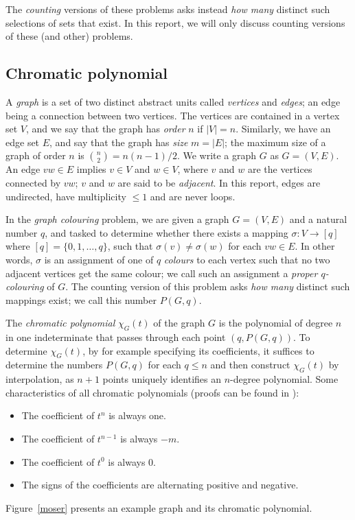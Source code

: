 \documentclass{cslthse-msc}
\begin{document}
The \emph{counting} versions of these problems asks instead \emph{how many} distinct such selections of sets that exist. In this report, we will only discuss counting versions of these (and other) problems.

\subsection{Chromatic polynomial}
A \emph{graph} is a set of two distinct abstract units called \emph{vertices} and \emph{edges}; an edge being a connection between two vertices. The vertices are contained in a vertex set $V$, and we say that the graph has \emph{order} $n$ if $|V| = n$. Similarly, we have an edge set $E$, and say that the graph has \emph{size} $m = |E|$; the maximum size of a graph of order $n$ is $\binom{n}{2} = n(n-1)/2$. We write a graph $G$ as $G = (V,E)$. An edge $vw \in E$ implies $v \in V$ and $w \in V$, where $v$ and $w$ are the vertices connected by $vw$; $v$ and $w$ are said to be \emph{adjacent}. In this report, edges are undirected, have multiplicity $\leq 1$ and are never loops.

In the \emph{graph colouring} problem, we are given a graph $G = (V,E)$ and a natural number $q$, and tasked to determine whether there exists a mapping $\sigma: V \rightarrow [q]$ where $[q] = \{0,1,\ldots,q\}$, such that $\sigma(v) \neq \sigma(w)$ for each $vw \in E$. In other words, $\sigma$ is an assignment of one of $q$ \emph{colours} to each vertex such that no two adjacent vertices get the same colour; we call such an assignment a \emph{proper $q$-colouring} of $G$. The counting version of this problem asks \emph{how many} distinct such mappings exist; we call this number $P(G,q)$.

The \emph{chromatic polynomial} $\chi_G(t)$ of the graph $G$ is the polynomial of degree $n$ in one indeterminate that passes through each point $(q, P(G,q))$. To determine $\chi_G(t)$, by for example specifying its coefficients, it suffices to determine the numbers $P(G,q)$ for each $q \leq n$ and then construct $\chi_G(t)$ by interpolation, as $n + 1$ points uniquely identifies an $n$-degree polynomial. Some characteristics of all chromatic polynomials (proofs can be found in \cite[p.13]{hubai}):
\begin{itemize}
 \item The coefficient of $t^n$ is always one.
 \item The coefficient of $t^{n-1}$ is always $-m$.
 \item The coefficient of $t^0$ is always 0.
 \item The signs of the coefficients are alternating positive and negative.
\end{itemize}
Figure~\ref{moser} presents an example graph and its chromatic polynomial.
\end{document}
